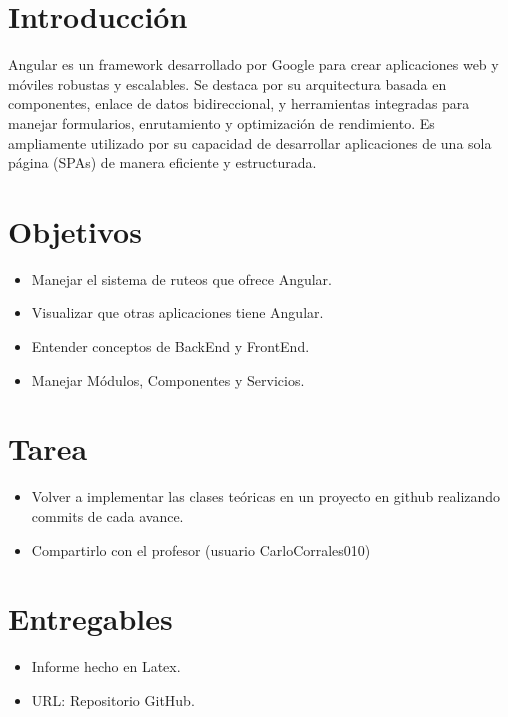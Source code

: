 \documentclass{article}
\begin{document}
  \section{Introducción}
  Angular es un framework desarrollado por Google para crear aplicaciones web y móviles robustas y escalables. 
  Se destaca por su arquitectura basada en componentes, enlace de datos bidireccional, y herramientas integradas 
  para manejar formularios, enrutamiento y optimización de rendimiento. Es ampliamente utilizado por su capacidad 
  de desarrollar aplicaciones de una sola página (SPAs) de manera eficiente y estructurada.


  \section{Objetivos}
  \begin{itemize}
    \item Manejar el sistema de ruteos que ofrece Angular.
    \item Visualizar que otras aplicaciones tiene Angular.
    \item Entender conceptos de BackEnd y FrontEnd.
    \item Manejar Módulos, Componentes y Servicios.
  \end{itemize}

 
	\section{Tarea}
  \begin{itemize}
    \item Volver a implementar las clases teóricas en un proyecto en github realizando commits de cada avance.  
    \item Compartirlo con el profesor (usuario CarloCorrales010)
  \end{itemize}
  
 
  \section{Entregables}
  \begin{itemize}
    \item Informe hecho en Latex.
    \item URL: Repositorio GitHub.
  \end{itemize}
  
\end{document}

